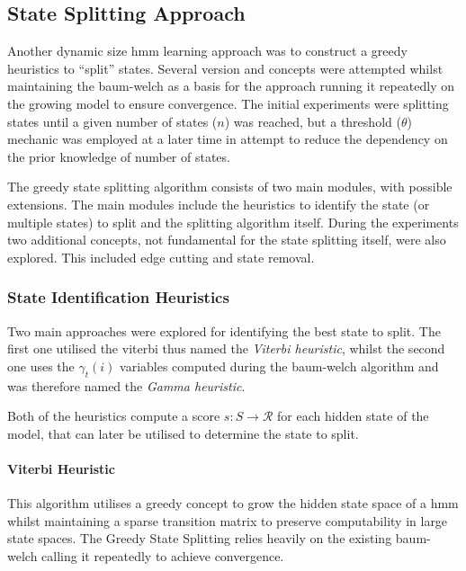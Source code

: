 \subsection{State Splitting Approach}

Another dynamic size \gls{hmm} learning approach was to construct a greedy heuristics to ``split'' states. Several version and concepts were attempted whilst maintaining the \gls{baum-welch} as a basis for the approach running it repeatedly on the growing model to ensure convergence. The initial experiments were splitting states until a given number of states ($n$) was reached, but a threshold ($\theta$) mechanic was employed at a later time in attempt to reduce the dependency on the prior knowledge of number of states.

The greedy state splitting algorithm consists of two main modules, with possible extensions. The main modules include the heuristics to identify the state (or multiple states) to split and the splitting algorithm itself. During the experiments two additional concepts, not fundamental for the state splitting itself, were also explored. This included edge cutting and state removal.

\subsubsection{State Identification Heuristics}
Two main approaches were explored for identifying the best state to split. The first one utilised the \gls{viterbi} thus named the \emph{Viterbi heuristic}, whilst the second one uses the $\gamma_t(i)$ variables computed during the \gls{baum-welch} algorithm and was therefore named the \emph{Gamma heuristic}.

Both of the heuristics compute a score $s:S \rightarrow \mathcal{R}$ for each hidden state of the model, that can later be utilised to determine the state to split.

\paragraph{Viterbi Heuristic}






This algorithm utilises a greedy concept to grow the hidden state space of a \gls{hmm} whilst maintaining a sparse transition matrix to preserve computability in large state spaces. The Greedy State Splitting relies heavily on the existing \gls{baum-welch} calling it repeatedly to achieve convergence.

